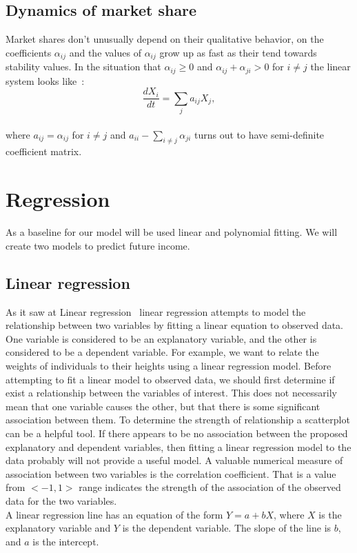 \subsection{Dynamics of market share} \label{subsec:marketshare}
Market shares don't unusually depend on their qualitative behavior, on the coefficients $\alpha_{ij}$ and the values
of $\alpha_{ij}$ grow up as fast as their tend towards stability values.
In the situation  that $\alpha_{ij} \geq 0$ and $\alpha_{ij} + \alpha_{ji} > 0$ for $i \neq j$ the linear system looks like~\cite{patel}:
\\
\begin{equation} \label{eq:17}
\frac{dX_i}{dt} = \sum_ja_{ij}X_j,
\end{equation}
\\
where $a_{ij} = \alpha_{ij}$ for $i \neq j$ and $a_{ii} - \sum_{i \neq j}\alpha_{ji}$ turns out to have semi-definite
coefficient matrix.

\section{Regression} \label{sec:regression}
As a baseline for our model will be used  linear and polynomial fitting. We will create two models to predict future income.\\
\subsection{Linear regression} \label{sec:linear}
As it saw at Linear regression~\cite{linear} linear regression attempts to model the relationship between two variables by fitting a linear equation to observed data.
One variable is considered to be an explanatory variable, and the other is considered to be a dependent variable.
For example, we want to relate the weights of individuals to their heights using a linear regression model.
Before attempting to fit a linear model to observed data, we should first determine if exist a relationship between the variables of interest.
This does not necessarily mean that one variable causes the other, but that there is some significant association between them.
To determine the strength of relationship a scatterplot can be a helpful tool.
If there appears to be no association between the proposed explanatory and dependent variables, then fitting a linear regression
model to the data probably will not provide a useful model.
A valuable numerical measure of association between two variables is the correlation coefficient.
That is a value from $<-1, 1>$ range indicates the strength of the association of the observed data for the two variables.\\
A linear regression line has an equation of the form $Y = a + bX$, where $X$ is the explanatory variable and $Y$ is the dependent variable.
The slope of the line is $b$, and $a$ is the intercept.

